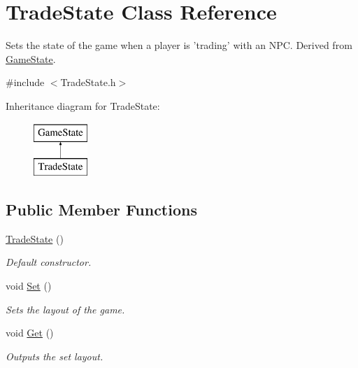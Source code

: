 \hypertarget{classTradeState}{\section{Trade\-State Class Reference}
\label{classTradeState}
}


Sets the state of the game when a player is 'trading' with an N\-P\-C. Derived from \hyperlink{classGameState}{Game\-State}.  




{\ttfamily \#include $<$Trade\-State.\-h$>$}

Inheritance diagram for Trade\-State\-:\begin{figure}[H]
\begin{center}
\leavevmode
\includegraphics[height=2.000000cm]{classTradeState}
\end{center}
\end{figure}
\subsection*{Public Member Functions}
\begin{DoxyCompactItemize}
\item 
\hypertarget{classTradeState_a1778870265717d50054d29be886b27d4}{\hyperlink{classTradeState_a1778870265717d50054d29be886b27d4}{Trade\-State} ()}\label{classTradeState_a1778870265717d50054d29be886b27d4}

\begin{DoxyCompactList}\small\item\em Default constructor. \end{DoxyCompactList}\item 
\hypertarget{classTradeState_af0d9fdcd649c1e74620dc77a4b8f92f9}{void \hyperlink{classTradeState_af0d9fdcd649c1e74620dc77a4b8f92f9}{Set} ()}\label{classTradeState_af0d9fdcd649c1e74620dc77a4b8f92f9}

\begin{DoxyCompactList}\small\item\em Sets the layout of the game. \end{DoxyCompactList}\item 
\hypertarget{classTradeState_a6479e704b1063281721200a0beac6bc1}{void \hyperlink{classTradeState_a6479e704b1063281721200a0beac6bc1}{Get} ()}\label{classTradeState_a6479e704b1063281721200a0beac6bc1}

\begin{DoxyCompactList}\small\item\em Outputs the set layout. \end{DoxyCompactList}\end{DoxyCompactItemize}
